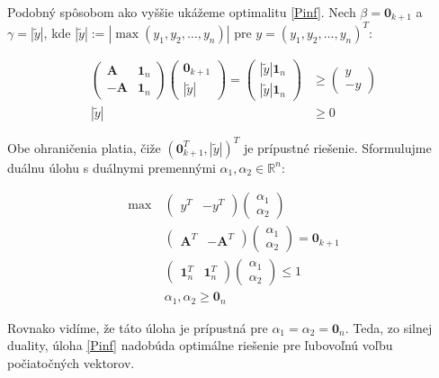 \documentclass[12pt,oneside,a4paper,slovak]{article}
\begin{document}
Podobný spôsobom ako vyššie ukážeme optimalitu \eqref{Pinf}. Nech $\beta = \mathbf{0}_{k+1}$ a $\gamma = |\tilde{y}|$, kde $|\tilde{y}| := |\max(y_1, y_2, \dots, y_n)|$ pre $y = (y_1, y_2, \dots, y_n)^T$:

\newpage

\begin{align*}
	\left(
	\begin{array}{c|c}
		\mathbf{A} & \mathbf{1}_n \\
		\hline
		-\mathbf{A} & \mathbf{1}_n
	\end{array}
	\right)
	\left(
	\begin{array}{c}
		\mathbf{0}_{k+1} \\
		\hline
		|\tilde{y}|
	\end{array}
	\right)
	=
	\left(
		\begin{array}{c}
			|\tilde{y}| \mathbf{1}_n \\
			\hline
			|\tilde{y}| \mathbf{1}_n
		\end{array}
	\right)
	&\geq
	\left(
		\begin{array}{c}
			y \\
			\hline
			-y
		\end{array}
	\right) \\
	|\tilde{y}| &\geq 0 
\end{align*}

Obe ohraničenia platia, čiže $(\mathbf{0}_{k+1}^T, |\tilde{y}|)^T$ je prípustné riešenie. Sformulujme duálnu úlohu s duálnymi premennými $\alpha_1, \alpha_2 \in \mathbb{R}^n$:

\begin{align*}
	\text{max}~ &
	\left(
		\begin{array}{c|c}
			y^T & -y^T
		\end{array}
	\right)
	\left(
		\begin{array}{c}
			\alpha_1 \\
			\hline
			\alpha_2
		\end{array}
	\right) \\
	&\left(
		\begin{array}{c|c}
			\mathbf{A}^T & -\mathbf{A}^T
		\end{array}
	\right)
	\left(
		\begin{array}{c}
			\alpha_1 \\
			\hline
			\alpha_2
		\end{array}
	\right)
	=
	\mathbf{0}_{k+1} \\
	&\left(
		\begin{array}{c|c}
			\mathbf{1}_n^T & \mathbf{1}_n^T
		\end{array}
	\right)
	\left(
		\begin{array}{c}
			\alpha_1 \\
			\hline
			\alpha_2
		\end{array}
	\right)
	\leq
	1 \\
	&\alpha_1, \alpha_2 \geq \mathbf{0}_{n} 
\end{align*}

Rovnako vidíme, že táto úloha je prípustná pre $\alpha_1 = \alpha_2 = \mathbf{0}_n$. Teda, zo silnej duality, úloha \eqref{Pinf} nadobúda optimálne riešenie pre ľubovoľnú voľbu počiatočných vektorov.
\end{document}

